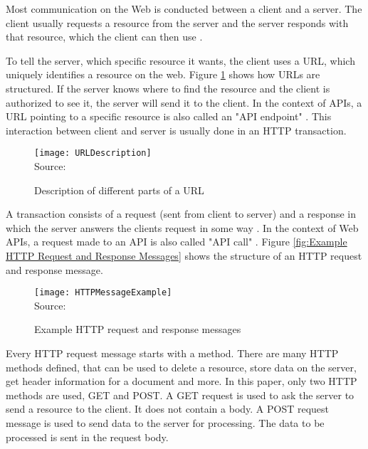 Most communication on the Web is conducted between a client and a server. The client usually
requests a resource from the server and the server responds with that resource, which the client
can then use \cite[4]{gourley2002http}.


To tell the server, which specific resource it wants, the client uses a \ac{URL}, which 
uniquely identifies a resource on the web. 
Figure \ref{fig:Description of different parts of a URL} shows how URLs are structured.
If the server knows where to find the resource and the client is authorized to see it,
the server will send it to the client.
In the context of APIs, a URL pointing to a specific resource is also called an "API endpoint" \cite{Cooksey2014}.
This interaction between client and server is usually done in an HTTP transaction.

\begin{figure}[H]
    \caption{Description of different parts of a URL}
	\label{fig:Description of different parts of a URL}
    \texttt{[image: URLDescription]}
    \\
    Source: \cite[24]{gourley2002http}
\end{figure}

A transaction consists of a request (sent from client to server) and a response in which the
server answers the clients request in some way \cite[8]{gourley2002http}.
In the context of Web APIs, a request made to an API is also called "API call" \cite{StoplightAPITypes}.
Figure \ref{fig:Example HTTP Request and Response Messages} shows the structure of an 
HTTP request and response message.

\begin{figure}[H]
    \caption{Example HTTP request and response messages}
	\label{fig:Example HTTP request and response messages}
    \texttt{[image: HTTPMessageExample]}
    \\
    Source: \cite[47]{gourley2002http}
\end{figure}

Every HTTP request message starts with a method.
There are many HTTP methods defined, that can be used to delete a resource, store
data on the server, get header information for a document and more.\cite[48]{gourley2002http}
In this paper, only two HTTP methods are used, GET and POST.
A GET request is used to ask the server to send a resource to the client.
It does not contain a body.\cite[48]{gourley2002http}
A POST request message is used to send data to the server for processing. The data to be
processed is sent in the request body.\cite[48]{gourley2002http}

